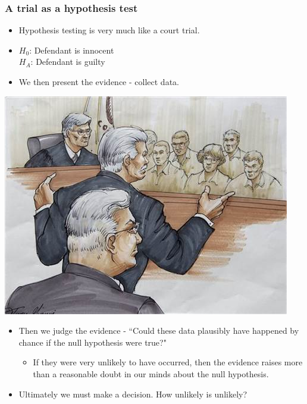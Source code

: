 \begin{frame}
\frametitle{A trial as a hypothesis test}

{
\begin{itemize}

\item Hypothesis testing is very much like a court trial.

\item $H_0$: Defendant is innocent \\
$H_A$: Defendant is guilty

\item We then present the evidence - collect data.

\end{itemize}
}
{
\includegraphics[width=\textwidth]{1-8_gender_discrimination/figures/trial}
}

\begin{itemize}

\item Then we judge the evidence - ``Could these data plausibly have happened by chance if the null hypothesis were true?"
\begin{itemize}
\item If they were very unlikely to have occurred, then the evidence raises more than a reasonable doubt in our minds about the null hypothesis.
\end{itemize}

\item Ultimately we must make a decision. How unlikely is unlikely?

\end{itemize}


\end{frame}

